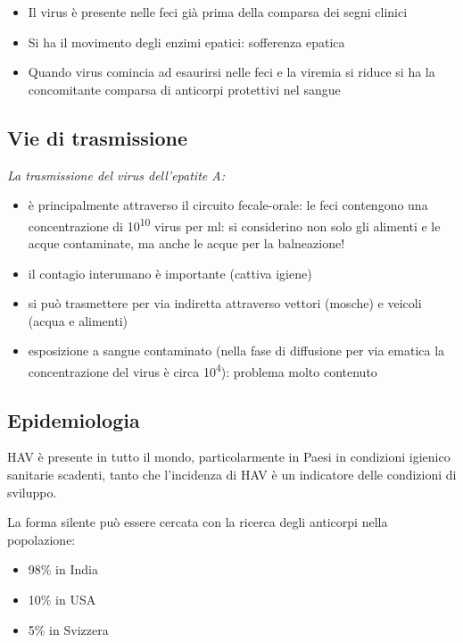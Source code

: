 \begin{itemize}
\item
  Il virus è presente nelle feci già prima della comparsa dei segni
  clinici
\item
  Si ha il movimento degli enzimi epatici: sofferenza epatica
\item
  Quando virus comincia ad esaurirsi nelle feci e la viremia si riduce
  si ha la concomitante comparsa di anticorpi protettivi nel sangue
\end{itemize}

\subsection{Vie di trasmissione}

\emph{La trasmissione del virus dell'epatite A:}

\begin{itemize}
\item
  è principalmente attraverso il circuito fecale-orale: le feci
  contengono una concentrazione di 10\textsuperscript{10} virus per ml:
  si considerino non solo gli alimenti e le acque contaminate, ma anche
  le acque per la balneazione!
\item
  il contagio interumano è importante (cattiva igiene)
\item
  si può trasmettere per via indiretta attraverso vettori (mosche) e
  veicoli (acqua e alimenti)
\item
  esposizione a sangue contaminato (nella fase di diffusione per via
  ematica la concentrazione del virus è circa 10\textsuperscript{4}):
  problema molto contenuto
\end{itemize}

\subsection{Epidemiologia}


HAV è presente in tutto il mondo, particolarmente in Paesi in condizioni
igienico sanitarie scadenti, tanto che l'incidenza di HAV è un
indicatore delle condizioni di sviluppo.

La forma silente può essere cercata con la ricerca degli anticorpi nella
popolazione:

\begin{itemize}
\item
  98\% in India
\item
  10\% in USA
\item
  5\% in Svizzera
\end{itemize}

